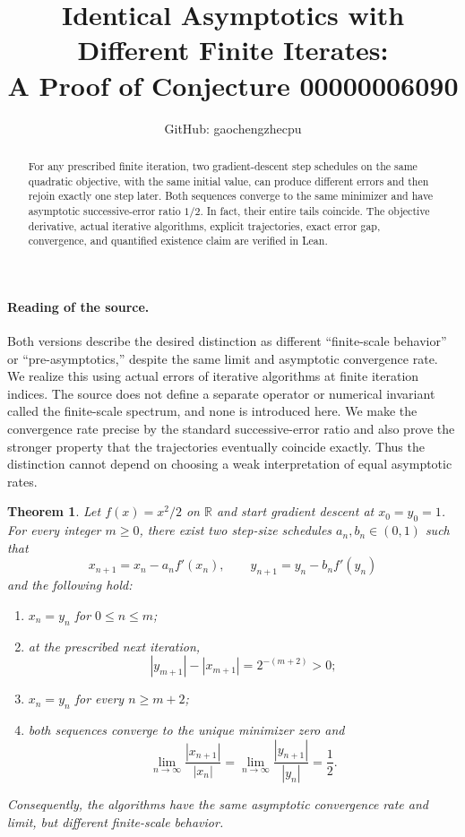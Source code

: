 \documentclass[11pt]{article}
\title{Identical Asymptotics with Different Finite Iterates:\\
A Proof of Conjecture 00000006090}
\author{GitHub: gaochengzhecpu}
\date{}
\newtheorem{theorem}{Theorem}
\newcommand{\R}{\mathbb R}
\begin{document}
\maketitle
\begin{abstract}
For any prescribed finite iteration, two gradient-descent step schedules
on the same quadratic objective, with the same initial value, can produce
different errors and then rejoin exactly one step later. Both sequences
converge to the same minimizer and have asymptotic successive-error ratio
$1/2$. In fact, their entire tails coincide. The objective derivative,
actual iterative algorithms, explicit trajectories, exact error gap,
convergence, and quantified existence claim are verified in Lean.
\end{abstract}

\paragraph{Reading of the source.}
Both versions describe the desired distinction as different
``finite-scale behavior'' or ``pre-asymptotics,'' despite the same limit
and asymptotic convergence rate. We realize this using actual errors
of iterative algorithms at finite iteration indices. The source does
not define a separate operator or numerical invariant called the
finite-scale spectrum, and none is introduced here. We make the
convergence rate precise by the standard successive-error ratio and
also prove the stronger property that the trajectories eventually
coincide exactly. Thus the distinction cannot depend on choosing a
weak interpretation of equal asymptotic rates.

\begin{theorem}\label{thm:main}
Let $f(x)=x^2/2$ on $\R$ and start gradient descent at $x_0=y_0=1$.
For every integer $m\geq0$, there exist two step-size schedules
$a_n,b_n\in(0,1)$ such that
\[
 x_{n+1}=x_n-a_nf'(x_n),\qquad
 y_{n+1}=y_n-b_nf'(y_n)
\]
and the following hold:
\begin{enumerate}
\item $x_n=y_n$ for $0\leq n\leq m$;
\item at the prescribed next iteration,
\[
 |y_{m+1}|-|x_{m+1}|=2^{-(m+2)}>0;
\]
\item $x_n=y_n$ for every $n\geq m+2$;
\item both sequences converge to the unique minimizer zero and
\[
 \lim_{n\to\infty}\frac{|x_{n+1}|}{|x_n|}
 =\lim_{n\to\infty}\frac{|y_{n+1}|}{|y_n|}=\frac12.
\]
\end{enumerate}
Consequently, the algorithms have the same asymptotic convergence
rate and limit, but different finite-scale behavior.
\end{theorem}
\end{document}
